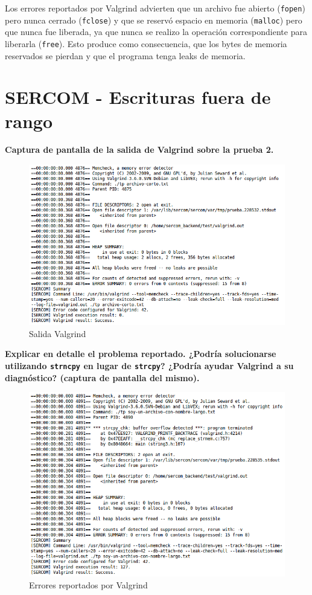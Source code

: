 \documentclass{article}
\begin{document}
    Los errores reportados por Valgrind advierten que un archivo fue abierto (\texttt{fopen}) pero nunca cerrado (\texttt{fclose}) y que se reservó espacio en memoria (\texttt{malloc}) pero que nunca fue liberada, ya que nunca se realizo la operación correspondiente para liberarla (\texttt{free}). Esto produce como consecuencia, que los bytes de memoria reservados se pierdan y que el programa tenga leaks de memoria.

\section{SERCOM - Escrituras fuera de rango}

\textbf{Captura de pantalla de la salida de Valgrind sobre la prueba 2.}

    \begin{figure}[H]
        \includegraphics[width=\columnwidth]{p5_valgrind}
        \caption{Salida Valgrind}
    \end{figure}
    
\textbf{Explicar en detalle el problema reportado. ¿Podría solucionarse utilizando \texttt{strncpy} en lugar de
\texttt{strcpy}? ¿Podría ayudar Valgrind a su diagnóstico? (captura de pantalla del mismo).}

    \begin{figure}[H]
        \includegraphics[width=\columnwidth]{p5_valgrind2}
        \caption{Errores reportados por Valgrind}
    \end{figure}
    
\end{document}

